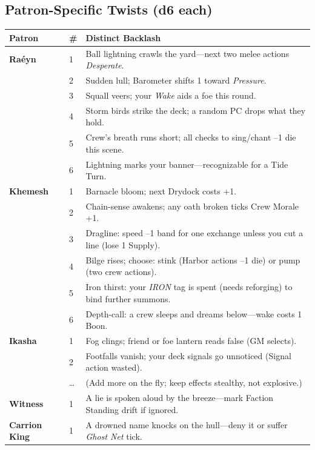 \documentclass[11pt,oneside]{book}
\begin{document}
\subsection*{Patron-Specific Twists (d6 each)}
\begin{tabularx}{\linewidth}{@{}p{2.9cm} p{0.7cm} X@{}}
\toprule
\textbf{Patron} & \# & \textbf{Distinct Backlash}\\
\midrule
\textbf{Raéyn} & 1 & Ball lightning crawls the yard---next two melee actions \emph{Desperate}.\\
 & 2 & Sudden lull; Barometer shifts 1 toward \emph{Pressure}.\\
 & 3 & Squall veers; your \emph{Wake} aids a foe this round.\\
 & 4 & Storm birds strike the deck; a random PC drops what they hold.\\
 & 5 & Crew's breath runs short; all checks to sing/chant --1 die this scene.\\
 & 6 & Lightning marks your banner---recognizable for a Tide Turn.\\
\textbf{Khemesh} & 1 & Barnacle bloom; next Drydock costs +1.\\
 & 2 & Chain-sense awakens; any oath broken ticks Crew Morale +1.\\
 & 3 & Dragline: speed --1 band for one exchange unless you cut a line (lose 1 Supply).\\
 & 4 & Bilge rises; choose: stink (Harbor actions --1 die) or pump (two crew actions).\\
 & 5 & Iron thirst: your \emph{IRON} tag is spent (needs reforging) to bind further summons.\\
 & 6 & Depth-call: a crew sleeps and dreams below---wake costs 1 Boon.\\
\textbf{Ikasha} & 1 & Fog clings; friend or foe lantern reads false (GM selects).\\
 & 2 & Footfalls vanish; your deck signals go unnoticed (Signal action wasted).\\
 & \dots & (Add more on the fly; keep effects stealthy, not explosive.)\\
\textbf{Witness} & 1 & A lie is spoken aloud by the breeze---mark Faction Standing drift if ignored.\\
\textbf{Carrion King} & 1 & A drowned name knocks on the hull---deny it or suffer \emph{Ghost Net} tick.\\
\bottomrule
\end{tabularx}

\end{document}

